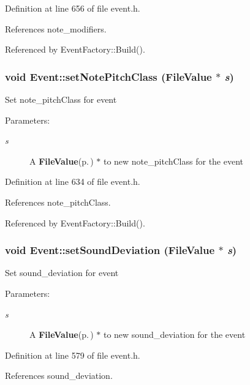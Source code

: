 Definition at line 656 of file event.h.

References note\_\-modifiers.

Referenced by Event\-Factory::Build().
\subsubsection{\setlength{\rightskip}{0pt plus 5cm}void Event::set\-Note\-Pitch\-Class ({\bf File\-Value} $\ast$ {\em s})\hspace{0.3cm}{\tt  [inline]}}\label{classEvent_a77}


Set note\_\-pitch\-Class for event \begin{Desc}
\item[Parameters:]
\begin{description}
\item[{\em s}]A {\bf File\-Value}{\rm (p.\,\pageref{classFileValue})} $\ast$ to new note\_\-pitch\-Class for the event \end{description}
\end{Desc}


Definition at line 634 of file event.h.

References note\_\-pitch\-Class.

Referenced by Event\-Factory::Build().
\subsubsection{\setlength{\rightskip}{0pt plus 5cm}void Event::set\-Sound\-Deviation ({\bf File\-Value} $\ast$ {\em s})\hspace{0.3cm}{\tt  [inline]}}\label{classEvent_a67}


Set sound\_\-deviation for event \begin{Desc}
\item[Parameters:]
\begin{description}
\item[{\em s}]A {\bf File\-Value}{\rm (p.\,\pageref{classFileValue})} $\ast$ to new sound\_\-deviation for the event \end{description}
\end{Desc}


Definition at line 579 of file event.h.

References sound\_\-deviation.

